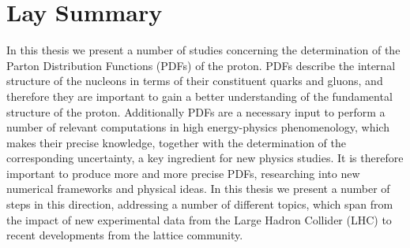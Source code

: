 \chapter*{Lay Summary}
In this thesis we present a number of studies concerning the determination of the
Parton Distribution Functions (PDFs) of the proton. 
PDFs describe the internal structure of the nucleons in terms of their constituent
quarks and gluons, and therefore they are important to gain a better understanding 
of the fundamental structure of the proton.
Additionally PDFs are a necessary input to perform a number of relevant computations
in high energy-physics phenomenology, which makes
their precise knowledge, together with the determination of the corresponding uncertainty,
a key ingredient for new physics studies. 
It is therefore important to produce more and more precise PDFs,
researching into new numerical frameworks and physical ideas. 
In this thesis we present a number of steps in this direction, addressing a number of different topics,
which span from the impact of new experimental data from the Large Hadron Collider (LHC)
to recent developments from the lattice community.


